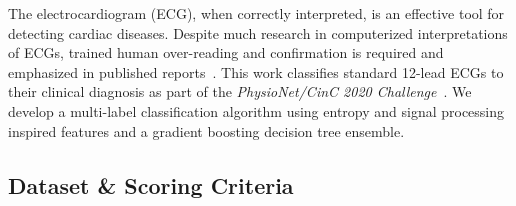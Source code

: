 \documentclass[twocolumn]{cinc}
\begin{document}
The electrocardiogram (ECG), when correctly interpreted, is an effective tool for detecting cardiac diseases.
Despite much research in computerized interpretations of ECGs, trained human over-reading and confirmation is required and emphasized in published reports~\cite{SMITH201988,MADIAS2018413}.
This work classifies standard 12-lead ECGs to their clinical diagnosis as part of the \emph{PhysioNet/CinC 2020 Challenge}~\cite{physionet_challenge_2020}.
We develop a multi-label classification algorithm using entropy and signal processing inspired features and a gradient boosting decision tree ensemble.

\subsection{Dataset \& Scoring Criteria}
\end{document}
